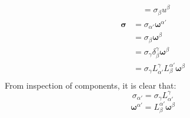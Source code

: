 \documentclass[9pt]{report}
\begin{document}
\begin{enumerate}
\[\begin{align}
                                                          &= \sigma_\beta u^\beta
    \end{align}
  \]
  \[
    \begin{align}
    \boldsymbol{\sigma} &= \sigma_{\alpha'}\boldsymbol{\omega}^{\alpha'}\\
                        &= \sigma_\beta \boldsymbol{\omega}^\beta \\
                        &= \sigma_\gamma \delta^\gamma_\beta \boldsymbol{\omega}^\beta \\
                        &= \sigma_\gamma L^\gamma_{\alpha'} L^{\alpha'}_\beta \boldsymbol{\omega}^\beta \\
    \end{align}
  \]
  From inspection of components, it is clear that:
  \[
    \sigma_{\alpha'} = \sigma_\gamma L^\gamma_{\alpha'} 
  \]
  \[
    \boldsymbol{\omega}^{\alpha'} = L^{\alpha'}_\beta \boldsymbol{\omega}^\beta
  \]
\end{enumerate}
\end{document}
